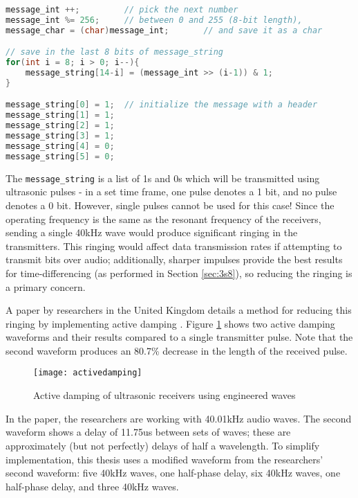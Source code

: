 \documentclass[12pt,a4paper]{report}
\begin{document}
\begin{lstlisting}[language=C++]
message_int ++;			// pick the next number
message_int %= 256;		// between 0 and 255 (8-bit length),
message_char = (char)message_int;		// and save it as a char

// save in the last 8 bits of message_string
for(int i = 8; i > 0; i--){				
	message_string[14-i] = (message_int >> (i-1)) & 1;
}

message_string[0] = 1; 	// initialize the message with a header
message_string[1] = 1;
message_string[2] = 1;
message_string[3] = 1;
message_string[4] = 0;
message_string[5] = 0;
\end{lstlisting}

The \verb|message_string| is a list of 1s and 0s which will be transmitted using ultrasonic pulses - in a set time frame, one pulse denotes a 1 bit, and no pulse denotes a 0 bit. However, single pulses cannot be used for this case! Since the operating frequency is the same as the resonant frequency of the receivers, sending a single 40kHz wave would produce significant ringing in the transmitters. This ringing would affect data transmission rates if attempting to transmit bits over audio; additionally, sharper impulses provide the best results for time-differencing (as performed in Section \ref{sec:3s8}), so reducing the ringing is a primary concern.

A paper by researchers in the United Kingdom details a method for reducing this ringing by implementing active damping \cite{activedamping}. Figure \ref{fig:activedamping} shows two active damping waveforms and their results compared to a single transmitter pulse. Note that the second waveform produces an 80.7\% decrease in the length of the received pulse.

\begin{figure}[htbp]
	\centering
	\texttt{[image: activedamping]}
	\caption{Active damping of ultrasonic receivers using engineered waves \cite{activedamping}}
	\label{fig:activedamping}
\end{figure}

\pagebreak

In the paper, the researchers are working with 40.01kHz audio waves. The second waveform shows a delay of 11.75us between sets of waves; these are approximately (but not perfectly) delays of half a wavelength. To simplify implementation, this thesis uses a modified waveform from the researchers’ second waveform: five 40kHz waves, one half-phase delay, six 40kHz waves, one half-phase delay, and three 40kHz waves. 
\end{document}
